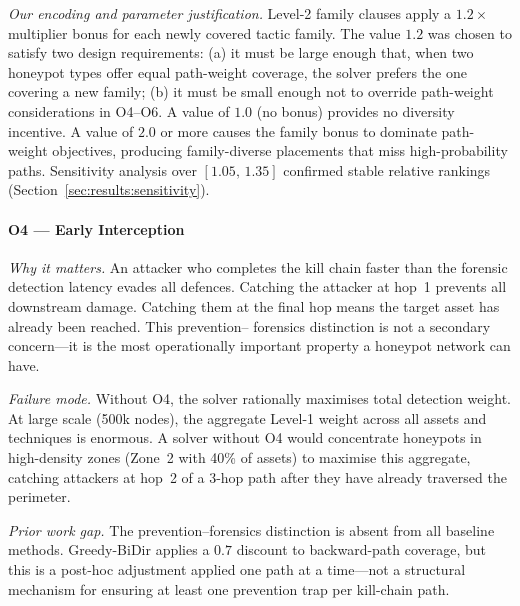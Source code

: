 \documentclass[journal]{IEEEtran}
\begin{document}
\textit{Our encoding and parameter justification.}
Level-2 family clauses apply a $1.2\times$ multiplier bonus for
each newly covered tactic family. The value $1.2$ was chosen to
satisfy two design requirements: (a) it must be large enough that,
when two honeypot types offer equal path-weight coverage, the solver
prefers the one covering a new family; (b) it must be small enough
not to override path-weight considerations in O4--O6. A value of
$1.0$ (no bonus) provides no diversity incentive. A value of $2.0$
or more causes the family bonus to dominate path-weight objectives,
producing family-diverse placements that miss high-probability paths.
Sensitivity analysis over $[1.05,\,1.35]$ confirmed stable relative
rankings (Section~\ref{sec:results:sensitivity}).

\paragraph{O4 --- Early Interception}
\textit{Why it matters.}
An attacker who completes the kill chain faster than the forensic
detection latency evades all defences. Catching the attacker at
hop~1 prevents all downstream damage. Catching them at the final hop
means the target asset has already been reached. This prevention--
forensics distinction is not a secondary concern---it is the most
operationally important property a honeypot network can have.

\textit{Failure mode.}
Without O4, the solver rationally maximises total detection weight.
At large scale (500k nodes), the aggregate Level-1 weight across
all assets and techniques is enormous. A solver without O4 would
concentrate honeypots in high-density zones (Zone~2 with 40\% of
assets) to maximise this aggregate, catching attackers at hop~2 of
a 3-hop path after they have already traversed the perimeter.

\textit{Prior work gap.}
The prevention--forensics distinction is absent from all baseline
methods. Greedy-BiDir applies a $0.7$ discount to backward-path
coverage, but this is a post-hoc adjustment applied one path at a
time---not a structural mechanism for ensuring at least one prevention
trap per kill-chain path.
\end{document}
